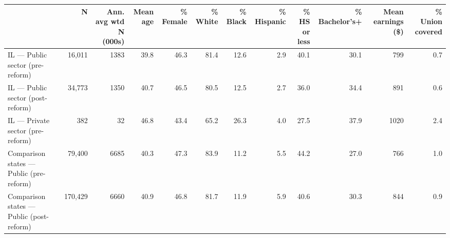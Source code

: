 \begin{tabular}{lrrrrrrrrrrr}
\toprule
 & N & Ann. avg wtd N (000s) & Mean age & \% Female & \% White & \% Black & \% Hispanic & \% HS or less & \% Bachelor's+ & Mean earnings (\$) & \% Union covered \\
\midrule
IL — Public sector (pre-reform) & 16,011 & 1383 & 39.8 & 46.3 & 81.4 & 12.6 & 2.9 & 40.1 & 30.1 & 799 & 0.7 \\
IL — Public sector (post-reform) & 34,773 & 1350 & 40.7 & 46.5 & 80.5 & 12.5 & 2.7 & 36.0 & 34.4 & 891 & 0.6 \\
IL — Private sector (pre-reform) & 382 & 32 & 46.8 & 43.4 & 65.2 & 26.3 & 4.0 & 27.5 & 37.9 & 1020 & 2.4 \\
Comparison states — Public (pre-reform) & 79,400 & 6685 & 40.3 & 47.3 & 83.9 & 11.2 & 5.5 & 44.2 & 27.0 & 766 & 1.0 \\
Comparison states — Public (post-reform) & 170,429 & 6660 & 40.9 & 46.8 & 81.7 & 11.9 & 5.9 & 40.6 & 30.3 & 844 & 0.9 \\
\bottomrule
\end{tabular}
